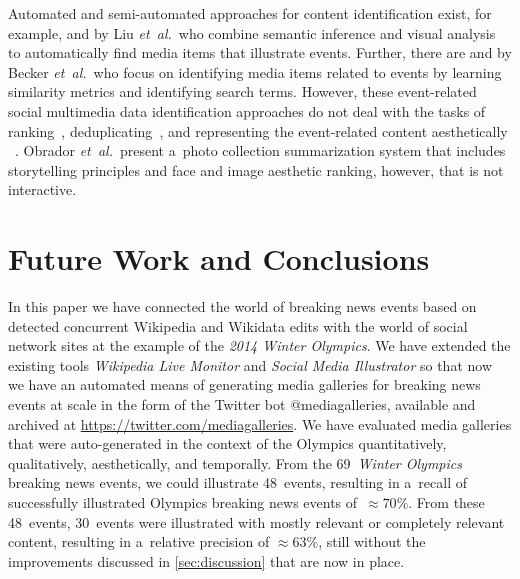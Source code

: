 \documentclass{sig-alternate-somus}
\newcommand{\inlinelistingsize}{\fontsize{8pt}{11pt}}
\let\oldurl\url
\renewcommand{\url}[1]{\inlinelistingsize\oldurl{#1}}
\begin{document}
Automated and semi-automated approaches for content identification exist,
for example, \cite{liu2011events} and \cite{liu2011socialmedia}
by Liu \emph{et~al.}\ who combine semantic inference
and visual analysis to automatically find media items
that illustrate events.
Further, there are \cite{becker2010eventidentification}
and \cite{becker2012plannedevents} by Becker \emph{et~al.}\
who focus on identifying media items related to events
by learning similarity metrics and identifying search terms.
However, these event-related social multimedia data
identification approaches do not deal with the tasks of
ranking~\cite{liu2009learningtorank}, deduplicating~\cite{yang2009nearduplicate},
and representing the event-related content aesthetically%
~\cite{sandhaus2011photobook,obrador2012photoaesthetics}.
Obrador \emph{et~al.}\ present a~photo collection summarization system
that includes storytelling principles and face and image aesthetic ranking,
however, that is not interactive.

\section{Future Work and Conclusions}
\label{sec:future-work-and-conclusions}
\selectfont

In this paper we have connected the world of breaking news events
based on detected concurrent Wikipedia and Wikidata edits
with the world of social network sites
at the example of the \emph{2014 Winter Olympics}.
We have extended the existing tools \emph{Wikipedia Live Monitor}
and \emph{Social Media Illustrator} so that now we have 
an automated means of generating media galleries
for breaking news events at scale
in the form of the Twitter bot @mediagalleries,
available and archived at \url{https://twitter.com/mediagalleries}.
We have evaluated media galleries that were auto-generated 
in the context of the Olympics quantitatively,
qualitatively, aesthetically, and temporally.
From the 69~\emph{Winter Olympics} breaking news events,
we could illustrate 48~events, resulting in a~recall of successfully illustrated Olympics breaking news events of~${\approx}70\%$. 
From these 48~events, 30~events were illustrated
with mostly relevant or completely relevant content,
resulting in a~relative precision of ${\approx}63\%$,
still without the improvements discussed in \autoref{sec:discussion}
that are now in place.
\end{document}
